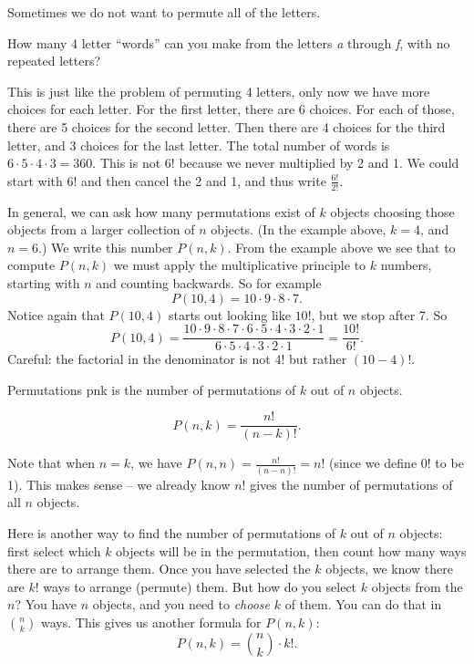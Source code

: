 \documentclass[12pt]{article}
\begin{document}
Sometimes we do not want to permute all of the letters. 

\begin{example}
  How many 4 letter ``words'' can you make from the letters \textit{a} through \textit{f}, with no repeated letters?
  \begin{solution}
    This is just like the problem of permuting 4 letters, only now we have more choices for each letter.  For the first letter, there are 6 choices.  For each of those, there are 5 choices for the second letter.  Then there are 4 choices for the third letter, and 3 choices for the last letter.  The total number of words is $6\cdot 5\cdot 4 \cdot 3 = 360$.  This is not $6!$ because we never multiplied by 2 and 1.  We could start with $6!$ and then cancel the 2 and 1, and thus write $\frac{6!}{2!}$.
  \end{solution}
\end{example}

In general, we can ask how many permutations exist of $k$ objects choosing those objects from a larger collection of $n$ objects.  (In the example above, $k = 4$, and $n = 6$.)  We write this number $P(n,k)$.  From the example above we see that to compute $P(n,k)$ we must apply the multiplicative principle to $k$ numbers, starting with $n$ and counting backwards.  So for example
\[P(10, 4) = 10\cdot 9 \cdot 8 \cdot 7.\]
Notice again that $P(10,4)$ starts out looking like $10!$, but we stop after 7.  So
\[P(10,4) = \frac{10\cdot 9 \cdot 8 \cdot 7 \cdot 6 \cdot 5 \cdot 4 \cdot 3 \cdot 2 \cdot 1}{6 \cdot 5 \cdot 4 \cdot 3 \cdot 2 \cdot 1} = \frac{10!}{6!}.\]
Careful: the factorial in the denominator is not $4!$ but rather $(10-4)!$.  

\begin{defbox}{Permutations}
 \gls{pnk} is the number of permutations of $k$ out of $n$ objects.
 
 \[P(n,k) = \frac{n!}{(n-k)!}.\]
\end{defbox}

Note that when $n = k$, we have $P(n,n) = \frac{n!}{(n-n)!} = n!$ (since we define $0!$ to be 1).  This makes sense -- we already know $n!$ gives the number of permutations of all $n$ objects.

Here is another way to find the number of permutations of $k$ out of $n$ objects: first select which $k$ objects will be in the permutation, then count how many ways there are to arrange them.  Once you have selected the $k$ objects, we know there are $k!$ ways to arrange (permute) them.  But how do you select $k$ objects from the $n$?  You have $n$ objects, and you need to {\em choose} $k$ of them.  You can do that in ${n \choose k}$ ways.  This gives us another formula for $P(n,k)$:
\[P(n,k) = {n \choose k}\cdot k!.\]
\end{document}
